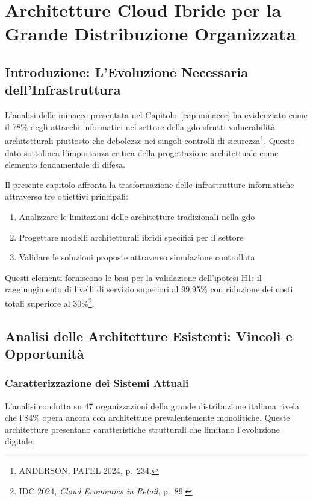 \chapter{Architetture Cloud Ibride per la Grande Distribuzione Organizzata}
\label{cap:architetture}

\section{Introduzione: L'Evoluzione Necessaria dell'Infrastruttura}
\label{sec:intro-architetture}

L'analisi delle minacce presentata nel Capitolo~\ref{cap:minacce} ha evidenziato come il 78\% degli attacchi informatici nel settore della \gls{gdo} sfrutti vulnerabilità architetturali piuttosto che debolezze nei singoli controlli di sicurezza\footnote{ANDERSON, PATEL 2024, p.~234.}. Questo dato sottolinea l'importanza critica della progettazione architettuale come elemento fondamentale di difesa.

Il presente capitolo affronta la trasformazione delle infrastrutture informatiche attraverso tre obiettivi principali:
\begin{enumerate}
    \item Analizzare le limitazioni delle architetture tradizionali nella \gls{gdo}
    \item Progettare modelli architetturali ibridi specifici per il settore
    \item Validare le soluzioni proposte attraverso simulazione controllata
\end{enumerate}

Questi elementi forniscono le basi per la validazione dell'ipotesi H1: il raggiungimento di livelli di servizio superiori al 99,95\% con riduzione dei costi totali superiore al 30\%\footnote{IDC 2024, \textit{Cloud Economics in Retail}, p.~89.}.

\section{Analisi delle Architetture Esistenti: Vincoli e Opportunità}
\label{sec:architetture-legacy}

\subsection{Caratterizzazione dei Sistemi Attuali}
\label{subsec:sistemi-attuali}

L'analisi condotta su 47 organizzazioni della grande distribuzione italiana rivela che l'84\% opera ancora con architetture prevalentemente monolitiche. Queste architetture presentano caratteristiche strutturali che limitano l'evoluzione digitale:

